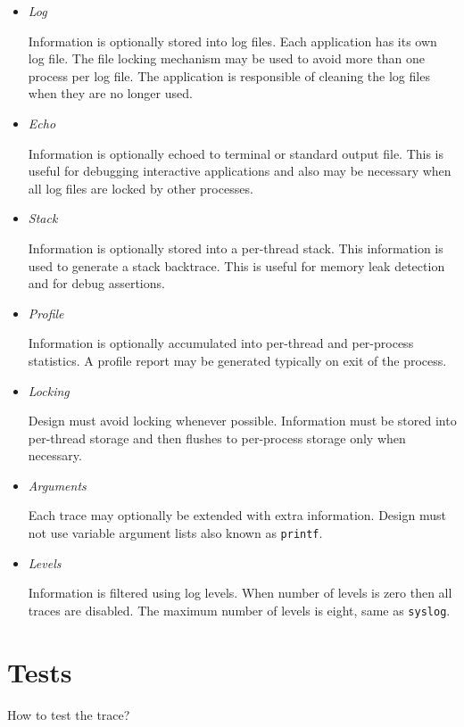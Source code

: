 \begin{itemize}

\item \emph{Log}

Information is optionally stored into log files.  Each application has its own
log file.  The file locking mechanism may be used to avoid more than one
process per log file.  The application is responsible of cleaning the log files
when they are no longer used.

\item \emph{Echo}

Information is optionally echoed to terminal or standard output file.  This is
useful for debugging interactive applications and also may be necessary when
all log files are locked by other processes.

\item \emph{Stack}

Information is optionally stored into a per-thread stack.  This information is
used to generate a stack backtrace.  This is useful for memory leak detection
and for debug assertions.

\item \emph{Profile}

Information is optionally accumulated into per-thread and per-process
statistics.  A profile report may be generated typically on exit of the
process.

\item \emph{Locking}

Design must avoid locking whenever possible.  Information must be stored
into per-thread storage and then flushes to per-process storage only when
necessary.

\item \emph{Arguments}

Each trace may optionally be extended with extra information.  Design must
not use variable argument lists also known as \verb|printf|.

\item \emph{Levels}

Information is filtered using log levels.  When number of levels is zero then
all traces are disabled.  The maximum number of levels is eight, same as
\verb|syslog|.

\end{itemize}

\section{Tests}

How to test the trace?



